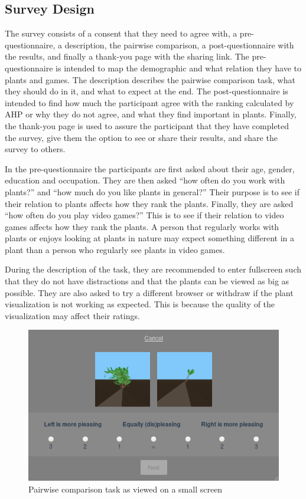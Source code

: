 \subsection{Survey Design}
The survey consists of a consent that they need to agree with, a pre-questionnaire, a description, the pairwise comparison, a post-questionnaire with the results, and finally a thank-you page with the sharing link.
The pre-questionnaire is intended to map the demographic and what relation they have to plants and games.
The description describes the pairwise comparison task, what they should do in it, and what to expect at the end.
The post-questionnaire is intended to find how much the participant agree with the ranking calculated by AHP or why they do not agree, and what they find important in plants.
Finally, the thank-you page is used to assure the participant that they have completed the survey, give them the option to see or share their results, and share the survey to others.

In the pre-questionnaire the participants are first asked about their age, gender, education and occupation.
They are then asked ``how often do you work with plants?'' and ``how much do you like plants in general?''
Their purpose is to see if their relation to plants affects how they rank the plants.
Finally, they are asked ``how often do you play video games?''
This is to see if their relation to video games affects how they rank the plants.
A person that regularly works with plants or enjoys looking at plants in nature may expect something different in a plant than a person who regularly see plants in video games.

During the description of the task, they are recommended to enter fullscreen such that they do not have distractions and that the plants can be viewed as big as possible.
They are also asked to try a different browser or withdraw if the plant visualization is not working as expected.
This is because the quality of the visualization may affect their ratings.

\begin{figure}
    \centering
    \includegraphics[width=1.0\textwidth]{figures/pairwise}
    \caption{Pairwise comparison task as viewed on a small screen}
    \label{fig:pairwise}
\end{figure}


